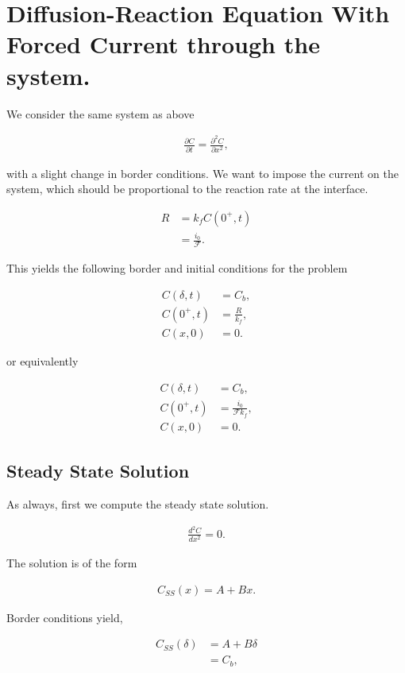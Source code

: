 \section{Diffusion-Reaction Equation With Forced Current through the system.}

We consider the same system as above

\begin{align}
	\frac{\partial C}{\partial t} = \frac{\partial^2 C}{\partial x^2},
\end{align}

with a slight change in border conditions. We want to impose the current on the system, which should be proportional to the reaction rate at the interface.

\begin{align}
	R &= k_f C(0^+, t)\\ 
	&= \frac{i_0}{\mathcal{F}}.
\end{align}

This yields the following border and initial conditions for the problem

\begin{align}
	C(\delta, t) &= C_b,\\
	C(0^+, t) &= \frac{R}{k_f},\\
	C(x, 0) &= 0.
\end{align}

or equivalently

\begin{align}
	C(\delta, t) &= C_b,\\
	C(0^+, t) &= \frac{i_0}{\mathcal{F}k_f},\\
	C(x, 0) &= 0.
\end{align}

\subsection{Steady State Solution}

As always, first we compute the steady state solution.

\begin{align}
	\frac{d ^2C}{d x^2} = 0.
\end{align}

The solution is of the form

\begin{align}
	C_{SS}(x) = A + Bx.
\end{align}

Border conditions yield,

\begin{align}
	C_{SS}(\delta) &= A + B\delta\\
	&= C_b,
\end{align}

